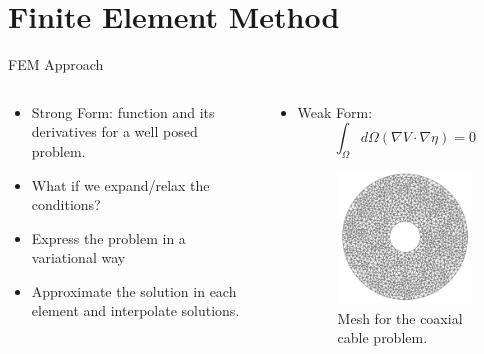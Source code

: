 \documentclass{beamer}
\begin{document}
\section{Finite Element Method}
\begin{frame}{FEM Approach}
    \begin{columns}
        \begin{column}{0.5\textwidth}
            \begin{itemize}
            \item<1-> Strong Form: function and its derivatives for a well posed problem.
            \item<2-> What if we expand/relax the conditions?
            \item<3-> Express the problem in a variational way
            \item<4-> Approximate the solution in each element and interpolate solutions.
            \end{itemize}
        \end{column}

        \begin{column}{0.4\textwidth}
            \begin{itemize}
                \item<5-> Weak Form:
                    \begin{equation*}
                        \int_{\Omega}d\Omega( \nabla V\cdot\nabla \eta )= 0
                    \end{equation*}
                \begin{figure}
                    \centering
                    \includegraphics[width=0.75  \textwidth]{Figures/Coaxial_Mesh-removebg-preview.png}
                    \caption{Mesh for the coaxial cable problem.}
                    \label{fig:Coax_Mesh}
                \end{figure}
            \end{itemize}
        \end{column}
    \end{columns}
\end{frame}
\end{document}
